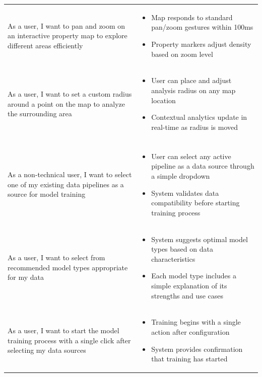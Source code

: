 \begin{longtable}{>{\raggedright\arraybackslash}p{}>{\raggedright\arraybackslash}p{}}
	\rowcolor[gray]{0.95}
	As a user, I want to pan and zoom on an interactive property map to explore different areas efficiently &
	\begin{itemize}
	\item Map responds to standard pan/zoom gestures within 100ms
	\item Property markers adjust density based on zoom level
	\end{itemize} \\
	  
	As a user, I want to set a custom radius around a point on the map to analyze the surrounding area &
	\begin{itemize}
	\item User can place and adjust analysis radius on any map location
	\item Contextual analytics update in real-time as radius is moved
	\end{itemize} \\
	
	\midrule
	\multicolumn{2}{l}{\textbf{Retrain Model with Data from Pipeline}} \\
	\midrule
	As a non-technical user, I want to select one of my existing data pipelines as a source for model training &
	\begin{itemize}
	\item User can select any active pipeline as a data source through a simple dropdown
	\item System validates data compatibility before starting training process
	\end{itemize} \\
	  
	\rowcolor[gray]{0.95}
	As a user, I want to select from recommended model types appropriate for my data &
	\begin{itemize}
	\item System suggests optimal model types based on data characteristics
	\item Each model type includes a simple explanation of its strengths and use cases
	\end{itemize} \\
	  
	As a user, I want to start the model training process with a single click after selecting my data sources &
	\begin{itemize}
	\item Training begins with a single action after configuration
	\item System provides confirmation that training has started
	\end{itemize} \\
	  

\end{longtable}
